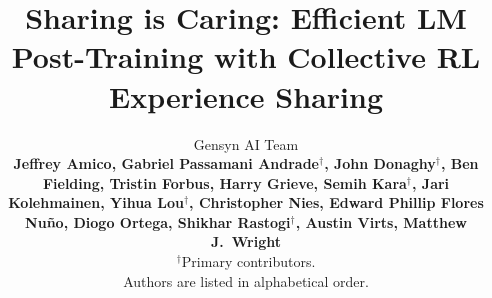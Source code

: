 \documentclass[11pt, a4paper, logo, singlecolumn, copyright]{gensyn}
\begin{document}
\title{Sharing is Caring: Efficient LM Post-Training with Collective RL Experience Sharing}


\author{Gensyn AI Team \\ 
\textbf{Jeffrey Amico, Gabriel Passamani Andrade$^\dagger$, John Donaghy$^\dagger$, Ben Fielding, Tristin Forbus, Harry Grieve, Semih Kara$^\dagger$, Jari Kolehmainen, Yihua Lou$^\dagger$, Christopher Nies, Edward Phillip Flores Nuño, Diogo Ortega, Shikhar Rastogi$^\dagger$, Austin Virts, Matthew J.~Wright} \\
$^\dagger$\small{Primary contributors.}\\
\small{Authors are listed in alphabetical order.}}




\end{document}

